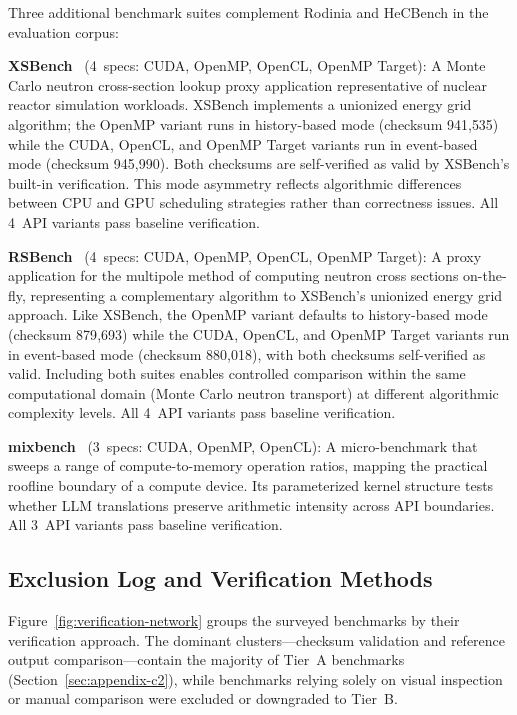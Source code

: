 Three additional benchmark suites complement Rodinia and HeCBench in the evaluation corpus:

\textbf{XSBench}~\cite{XSBench2014} (4~specs: CUDA, OpenMP, OpenCL, OpenMP Target): A Monte Carlo neutron cross-section lookup proxy application representative of nuclear reactor simulation workloads. XSBench implements a unionized energy grid algorithm; the OpenMP variant runs in history-based mode (checksum 941{,}535) while the CUDA, OpenCL, and OpenMP Target variants run in event-based mode (checksum 945{,}990). Both checksums are self-verified as valid by XSBench's built-in verification. This mode asymmetry reflects algorithmic differences between CPU and GPU scheduling strategies rather than correctness
issues. All 4~API variants pass baseline verification.

\textbf{RSBench}~\cite{RSBench2014} (4~specs: CUDA, OpenMP, OpenCL, OpenMP Target): A proxy application for the multipole method of computing neutron cross sections on-the-fly, representing a complementary algorithm to XSBench's unionized energy grid approach. Like XSBench, the OpenMP variant defaults to history-based mode (checksum 879{,}693) while the CUDA, OpenCL, and OpenMP Target variants run in event-based mode (checksum 880{,}018), with both checksums self-verified as valid. Including both suites enables controlled comparison within the same computational domain (Monte Carlo neutron transport) at different algorithmic complexity levels. All 4~API variants pass baseline verification.

\textbf{mixbench}~\cite{mixbench2017} (3~specs: CUDA, OpenMP, OpenCL): A micro-benchmark that sweeps a range of compute-to-memory operation ratios, mapping the practical roofline boundary of a compute device. Its parameterized kernel structure tests whether LLM translations preserve arithmetic intensity across API boundaries. All 3~API variants pass baseline verification.

\subsection{Exclusion Log and Verification Methods}
  \label{sec:appendix-c6}

  Figure~\ref{fig:verification-network} groups the surveyed benchmarks by their
  verification approach. The dominant clusters---checksum validation and reference
  output comparison---contain the majority of Tier~A benchmarks
  (Section~\ref{sec:appendix-c2}), while benchmarks relying solely on visual
  inspection or manual comparison were excluded or downgraded to Tier~B.

